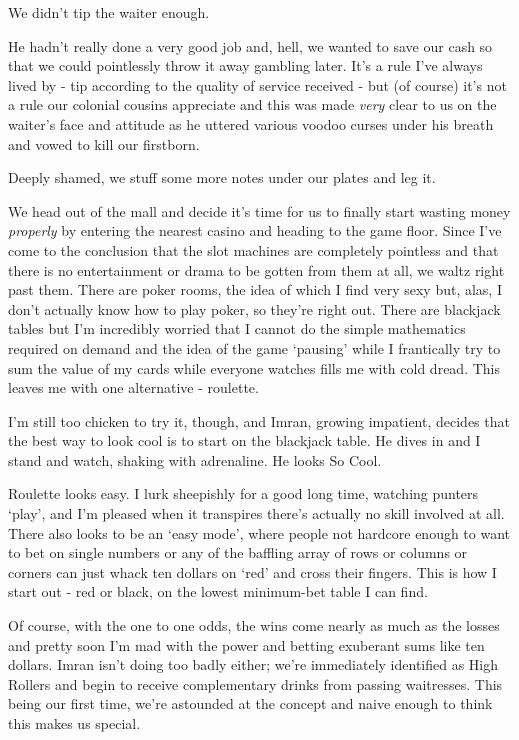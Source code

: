 \documentclass[a5paper,titlepage,11pt]{book}
\begin{document}
We didn't tip the waiter enough.

He hadn't really done a very good job and, hell, we wanted to save our cash so that we could pointlessly throw it away gambling later. It's a rule I've always lived by - tip according to the quality of service received - but (of course) it's not a rule our colonial cousins appreciate and this was made \emph{very} clear to us on the waiter's face and attitude as he uttered various voodoo curses under his breath and vowed to kill our firstborn.

Deeply shamed, we stuff some more notes under our plates and leg it.

We head out of the mall and decide it's time for us to finally start wasting money \emph{properly} by entering the nearest casino and heading to the game floor. Since I've come to the conclusion that the slot machines are completely pointless and that there is no entertainment or drama to be gotten from them at all, we waltz right past them. There are poker rooms, the idea of which I find very sexy but, alas, I don't actually know how to play poker, so they're right out. There are blackjack tables but I'm incredibly worried that I cannot do the simple mathematics required on demand and the idea of the game `pausing' while I frantically try to sum the value of my cards while everyone watches fills me with cold dread. This leaves me with one alternative - roulette. 

I'm still too chicken to try it, though, and Imran, growing impatient, decides that the best way to look cool is to start on the blackjack table. He dives in and I stand and watch, shaking with adrenaline. He looks So Cool.

Roulette looks easy. I lurk sheepishly for a good long time, watching punters `play', and I'm pleased when it transpires there's actually no skill involved at all. There also looks to be an `easy mode', where people not hardcore enough to want to bet on single numbers or any of the baffling array of rows or columns or corners can just whack ten dollars on `red' and cross their fingers. This is how I start out - red or black, on the lowest minimum-bet table I can find.

Of course, with the one to one odds, the wins come nearly as much as the losses and pretty soon I'm mad with the power and betting exuberant sums like ten dollars. Imran isn't doing too badly either; we're immediately identified as High Rollers and begin to receive complementary drinks from passing waitresses. This being our first time, we're astounded at the concept and naive enough to think this makes us special.
\end{document}
